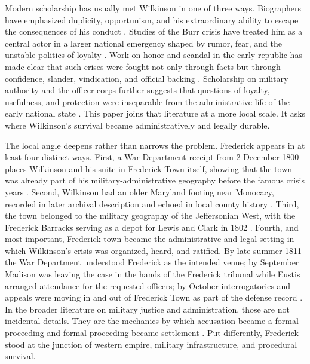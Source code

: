 Modern scholarship has usually met Wilkinson in one of three ways. Biographers have emphasized duplicity, opportunism, and his extraordinary ability to escape the consequences of his conduct \citep{jacobs1938,linklater2009,cox2023}. Studies of the Burr crisis have treated him as a central actor in a larger national emergency shaped by rumor, fear, and the unstable politics of loyalty \citep{lewis2017,sharp1993,wood2009}. Work on honor and scandal in the early republic has made clear that such crises were fought not only through facts but through confidence, slander, vindication, and official backing \citep{freeman2002,kierner2024}. Scholarship on military authority and the officer corps further suggests that questions of loyalty, usefulness, and protection were inseparable from the administrative life of the early national state \citep{kohn1975,stagg1983,watson2012}. This paper joins that literature at a more local scale. It asks where Wilkinson's survival became administratively and legally durable.

The local angle deepens rather than narrows the problem. Frederick appears in at least four distinct ways. First, a War Department receipt from 2 December 1800 places Wilkinson and his suite in Frederick Town itself, showing that the town was already part of his military-administrative geography before the famous crisis years \citep{wardepartment1800receipt}. Second, Wilkinson had an older Maryland footing near Monocacy, recorded in later archival description and echoed in local county history \citep{clementsfindingaid,traceydern1987}. Third, the town belonged to the military geography of the Jeffersonian West, with the Frederick Barracks serving as a depot for Lewis and Clark in 1802 \citep{frederickbarracks,onuf2000}. Fourth, and most important, Frederick-town became the administrative and legal setting in which Wilkinson's crisis was organized, heard, and ratified. By late summer 1811 the War Department understood Frederick as the intended venue; by September Madison was leaving the case in the hands of the Frederick tribunal while Eustis arranged attendance for the requested officers; by October interrogatories and appeals were moving in and out of Frederick Town as part of the defense record \citep{eustis1811a,madison1811eustis,eustis1811b,kinson1811,wilkinson1811madison,adams1811wilkinson}. In the broader literature on military justice and administration, those are not incidental details. They are the mechanics by which accusation became a formal proceeding and formal proceeding became settlement \citep{lurie2001,kohn1975,stagg1983}. Put differently, Frederick stood at the junction of western empire, military infrastructure, and procedural survival.

